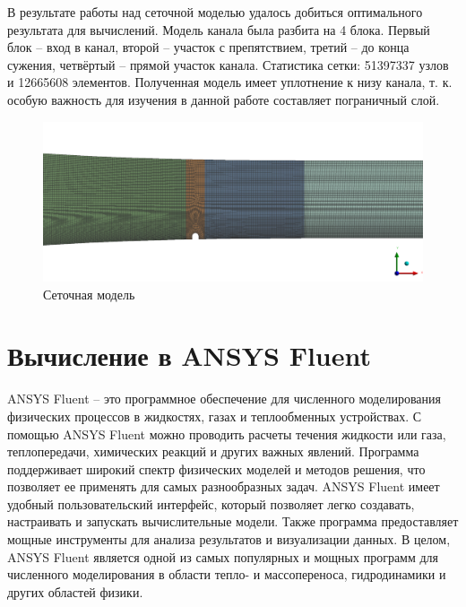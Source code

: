	В результате работы над сеточной моделью удалось добиться оптимального результата для вычислений. Модель канала была разбита на 4 блока. Первый блок -- вход в канал, второй -- участок с препятствием, третий -- до конца сужения, четвёртый -- прямой участок канала. Статистика сетки: 51397337 узлов и 12665608 элементов. Полученная модель имеет уплотнение к низу канала, т. к. особую важность для изучения в данной работе составляет пограничный слой.
	\begin{figure}[H]
		\centering
		\includegraphics[width=1\linewidth]{../Assets/Mesh1}
		\caption{Сеточная модель}
		\label{fig:mesh1}
	\end{figure}
	
\section{Вычисление в ANSYS Fluent}
	ANSYS Fluent -- это программное обеспечение для численного моделирования физических процессов в жидкостях, газах и теплообменных устройствах. С помощью ANSYS Fluent можно проводить расчеты течения жидкости или газа, теплопередачи, химических реакций и других важных явлений. Программа поддерживает широкий спектр физических моделей и методов решения, что позволяет ее применять для самых разнообразных задач. ANSYS Fluent имеет удобный пользовательский интерфейс, который позволяет легко создавать, настраивать и запускать вычислительные модели. Также программа предоставляет мощные инструменты для анализа результатов и визуализации данных. В целом, ANSYS Fluent является одной из самых популярных и мощных программ для численного моделирования в области тепло- и массопереноса, гидродинамики и других областей физики.
	

